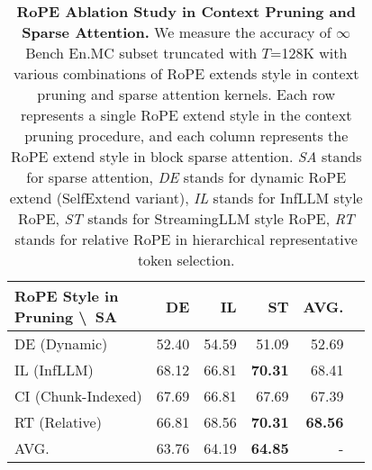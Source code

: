 \begin{table}[t]
\caption{\textbf{RoPE Ablation Study in Context Pruning and Sparse Attention.} We measure the accuracy of $\infty$Bench En.MC subset truncated with $T$=128K with various combinations of RoPE extends style in context pruning and sparse attention kernels. Each row represents a single RoPE extend style in the context pruning procedure, and each column represents the RoPE extend style in block sparse attention. \textit{SA} stands for sparse attention, \textit{DE} stands for dynamic RoPE extend (SelfExtend variant), \textit{IL} stands for InfLLM style RoPE, \textit{ST} stands for StreamingLLM style RoPE, \textit{RT} stands for relative RoPE in hierarchical representative token selection.}
\label{tab:rope_ablation}
\vspace{1.0em}
\centering
\small
\begin{tabular}{lrrrrr}\toprule
\makecell[r]{RoPE Style in\\Pruning \textbackslash\ SA} &DE &IL &ST &AVG. \\\midrule
DE (Dynamic) 
    &\cellcolor[HTML]{ff8c6c}52.40 
    &\cellcolor[HTML]{ff9c64}54.59 
    &\cellcolor[HTML]{ff8370}51.09 
    &\cellcolor[HTML]{ff8370}52.69 \\
IL (InfLLM)
    &\cellcolor[HTML]{3ab799}68.12
    &\cellcolor[HTML]{5dba8b}66.81 
    &\cellcolor[HTML]{00b1b0}\textbf{70.31} 
    &\cellcolor[HTML]{05b2ae}68.41 \\
CI (Chunk-Indexed)
    &\cellcolor[HTML]{46b895}67.69 
    &\cellcolor[HTML]{5dba8b}66.81 
    &\cellcolor[HTML]{46b894}67.69 
    &\cellcolor[HTML]{26b5a1}67.39 \\
RT (Relative)
    &\cellcolor[HTML]{5dba8b}66.81 
    &\cellcolor[HTML]{2fb69d}68.56 
    &\cellcolor[HTML]{01b2af}\textbf{70.31} 
    &\cellcolor[HTML]{00b1b0}\textbf{68.56} \\
AVG.
    &\cellcolor[HTML]{ff8370}63.76 
    &\cellcolor[HTML]{ffba54}64.19 
    &\cellcolor[HTML]{00b1b0}\textbf{64.85} 
    &- \\
\bottomrule
\end{tabular}
\vspace{-1em}
\end{table}